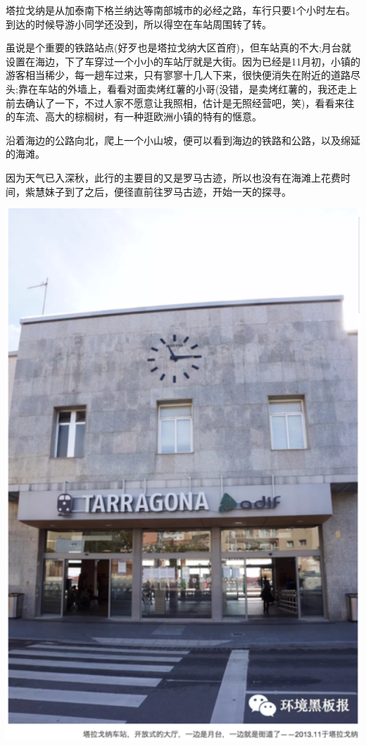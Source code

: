 \documentclass[]{book}
\begin{document}
塔拉戈纳是从加泰南下格兰纳达等南部城市的必经之路，车行只要1个小时左右。到达的时候导游小同学还没到，所以得空在车站周围转了转。

虽说是个重要的铁路站点(好歹也是塔拉戈纳大区首府)，但车站真的不大;月台就设置在海边，下了车穿过一个小小的车站厅就是大街。因为已经是11月初，小镇的游客相当稀少，每一趟车过来，只有寥寥十几人下来，很快便消失在附近的道路尽头;靠在车站的外墙上，看看对面卖烤红薯的小哥(没错，是卖烤红薯的，我还走上前去确认了一下，不过人家不愿意让我照相，估计是无照经营吧，笑)，看看来往的车流、高大的棕榈树，有一种逛欧洲小镇的特有的惬意。

沿着海边的公路向北，爬上一个小山坡，便可以看到海边的铁路和公路，以及绵延的海滩。

因为天气已入深秋，此行的主要目的又是罗马古迹，所以也没有在海滩上花费时间，紫慧妹子到了之后，便径直前往罗马古迹，开始一天的探寻。

\includegraphics[width=5.56in]{images/xt25}
\end{document}
